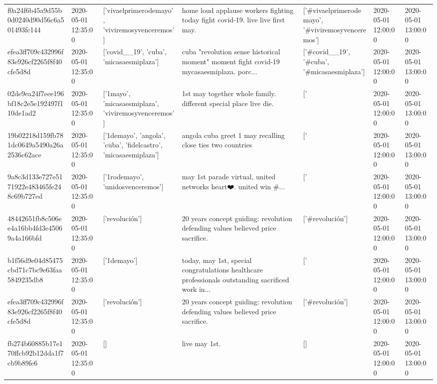 \begin{tabular}{lllllll}
f0a24f6b45a9d55b0d0240d90d56c6a501493fc144 & 2020-05-01 12:35:00 & ['vivaelprimerodemayo', 'viviremosyvenceremos'] & home loud applause workers fighting today fight covid-19. live live first may. & ['#vivaelprimerodemayo', '#viviremosyvenceremos'] & 2020-05-01 12:00:00 & 2020-05-01 13:00:00 \\
efea3ff709c432996f83e926cf2265f8f40cfe5d8d & 2020-05-01 12:35:00 & ['covid__19', 'cuba', 'micasaesmiplaza'] & cuba "revolution sense historical moment" moment fight covid-19 mycasaesmiplaza. porc... & ['#covid__19', '#cuba', '#micasaesmiplaza'] & 2020-05-01 12:00:00 & 2020-05-01 13:00:00 \\
02de9ea24f7eee196bf18c2e5e192497f110de1ad2 & 2020-05-01 12:35:00 & ['1mayo', 'micasaesmiplaza', 'viviremosyvenceremos'] & 1st may together whole family. different special place live die. & ['#1mayo', '#micasaesmiplaza', '#viviremosyvenceremos'] & 2020-05-01 12:00:00 & 2020-05-01 13:00:00 \\
19b02218d159fb781dc0649a5490a26a2536c62ace & 2020-05-01 12:35:00 & ['1demayo', 'angola', 'cuba', 'fidelcastro', 'micasaesmiplaza'] & angola cuba greet 1 may recalling close ties two countries & ['#1demayo', '#cuba', '#fidelcastro', '#micasaesmiplaza'] & 2020-05-01 12:00:00 & 2020-05-01 13:00:00 \\
9a8c3d133e727e5171922e483465fe248c69b727ed & 2020-05-01 12:35:00 & ['1rodemayo', 'unidosvenceremos'] & may 1st parade virtual, united networks heart❤️. united win \#... & ['#1rodemayo', '#unidosvenceremos'] & 2020-05-01 12:00:00 & 2020-05-01 13:00:00 \\
48442651fb8c506ee4a16bb4fd3e45069a4a166bfd & 2020-05-01 12:35:00 & ['revolución'] & 20 years concept guiding: revolution defending values believed price sacrifice. & ['#revolución'] & 2020-05-01 12:00:00 & 2020-05-01 13:00:00 \\
b1f56d9e04d85475cbd71c7bc9e63faa5849235db8 & 2020-05-01 12:35:00 & ['1demayo'] & today, may 1st, special congratulations healthcare professionals outstanding sacrificed work in... & ['#1demayo'] & 2020-05-01 12:00:00 & 2020-05-01 13:00:00 \\
efea3ff709c432996f83e926cf2265f8f40cfe5d8d & 2020-05-01 12:35:00 & ['revolución'] & 20 years concept guiding: revolution defending values believed price sacrifice. & ['#revolución'] & 2020-05-01 12:00:00 & 2020-05-01 13:00:00 \\
fb274b60885b17e170ffcb92b12dda1f7cb9b89fe6 & 2020-05-01 12:35:00 & [] & live may 1st. & [] & 2020-05-01 12:00:00 & 2020-05-01 13:00:00 \\

\end{tabular}
